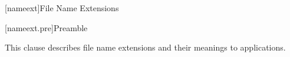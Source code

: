 
[nameext]{File Name Extensions}

[nameext.pre]{Preamble}

\pnum
This clause describes file name extensions and their meanings to applications.
